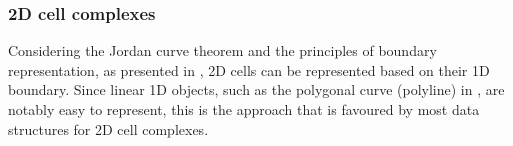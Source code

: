 \subsubsection{2D cell complexes}

Considering the Jordan curve theorem \citep{Jordan87} and the principles of boundary representation, as presented in , 2D cells can be represented based on their 1D boundary.
Since linear 1D objects, such as the polygonal curve (polyline) in , are notably easy to represent, this is the approach that is favoured by most data structures for 2D cell complexes.
